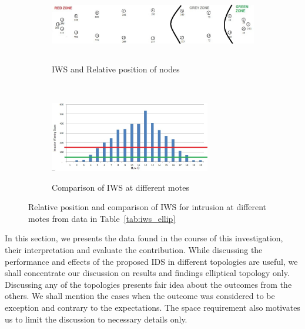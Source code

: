 \documentclass[conference,manuscript]{IEEEtran}
\newcommand{\notedme}[1]{\raisebox{0pt}[0pt][0pt]{\pdfcomment[open=true,color=blue]{#1}}}
\begin{document}
\begin{figure}[t!]
\label{fig:ellip}
    \centering
    \begin{subfigure}[b]{0.5\textwidth}
        \centering
        \includegraphics[height=1in, width=4in]{Elliptical}
        \label{subfig:elliptopo}
        \caption{IWS and Relative position of nodes}
    \end{subfigure}%
    ~ 
    \begin{subfigure}[b]{0.5\textwidth}
        \centering
        \includegraphics[height=1.2in]{Elliptical_column}
        \label{subfig:ellipgraph}
        \caption{Comparison of IWS at different motes}
    \end{subfigure}
    \caption{Relative position and comparison of IWS for intrusion at different motes from data in Table~\ref{tab:iws_ellip}}
\end{figure}

In this section, we presents the data found in the course of this investigation, their interpretation and evaluate the contribution.
While discussing the performance and effects of the proposed IDS in different topologies are useful, we shall concentrate our discussion on results and findings elliptical topology only.
Discussing any of the topologies presents fair idea about the outcomes from the others. 
We shall mention the cases when the outcome was considered to be exception and contrary to the expectations.
The space requirement also motivates us to limit the discussion to necessary details only.
\end{document}
